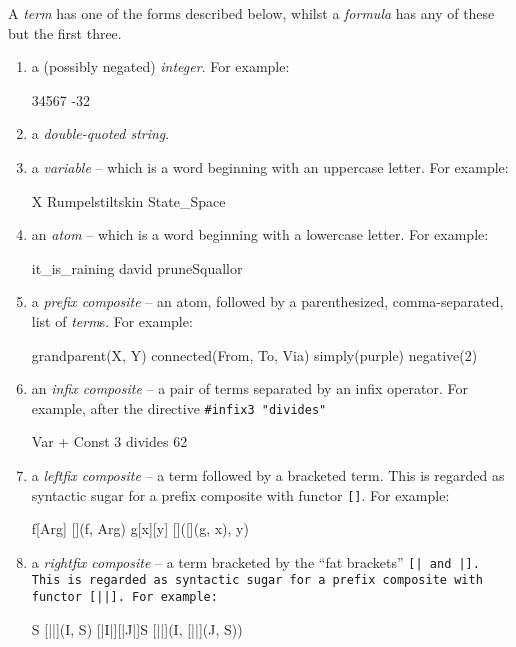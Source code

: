 A \emph{term} has one of the forms described below, whilst a {\em formula} has any of these 
but the first three.
\begin{enumerate}
\item  a (possibly negated) \emph{integer}. For example:
\begin{smalltt}
        34567
        -32
\end{smalltt}
\item  a \emph{double-quoted string}.
\item  a \emph{variable} -- which is a word beginning with an uppercase letter. For example:
\begin{smalltt}
        X
        Rumpelstiltskin
        State_Space
\end{smalltt}
 
\item  an \emph{atom} --  which is a word beginning with a lowercase letter. For example:
\begin{smalltt}
        it_is_raining
        david
        pruneSquallor
\end{smalltt}
\item  a \emph{prefix composite} -- an atom, followed by a parenthesized, 
        comma-separated, list of \emph{term}s.  
For example:
\begin{smalltt}
        grandparent(X, Y)
        connected(From, To, Via)
        simply(purple)
        negative(2)
\end{smalltt}
\item an \emph{infix composite} -- a pair of terms separated by an infix operator. 
For example, after the directive {\tt \#infix3 "divides"}
\begin{smalltt}
        Var + Const
        3 divides 62
\end{smalltt}
\item a \emph{leftfix composite} -- a term followed by a bracketed term.
        This is regarded as syntactic sugar 
        for a prefix composite with functor {\tt{[]}}.
For example:
\begin{smalltt}
        f[Arg]  [](f, Arg)
        g[x][y]  []([](g, x), y)
\end{smalltt}
\item a \emph{rightfix composite} -- a term bracketed by the ``fat
brackets'' \tt{[|} and \tt{|]}. This is regarded as syntactic sugar 
        for a prefix composite with functor {\tt{[||]}}.
For example:
\begin{smalltt}
        [|I|] S  [||](I, S)
        [|I|][|J|]S  [||](I, [||](J, S))
\end{smalltt}


\end{enumerate}
